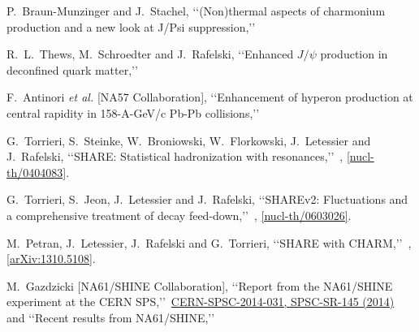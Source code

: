 \begin{thebibliography}{100}
  P.~Braun-Munzinger and J.~Stachel,
\lq\lq (Non)thermal aspects of charmonium production and a new look at J/Psi suppression,\rq\rq\
  
  R.~L.~Thews, M.~Schroedter and J.~Rafelski,
\lq\lq Enhanced $J/\psi$ production in deconfined quark matter,\rq\rq\
 
 

  F.~Antinori {\it et al.} [NA57 Collaboration],
\lq\lq Enhancement of hyperon production at central rapidity in 158-A-GeV/c Pb-Pb collisions,\rq\rq\
    



 G.~Torrieri, S.~Steinke, W.~Broniowski, W.~Florkowski, J.~Letessier and J.~Rafelski,
 \lq\lq SHARE: Statistical hadronization with resonances,\rq\rq\ 
 , 
 \href{http://arxiv.org/abs/nucl-th/0404083}{[nucl-th/0404083]}.

 
 G.~Torrieri, S.~Jeon, J.~Letessier and J.~Rafelski,
 \lq\lq SHAREv2: Fluctuations and a comprehensive treatment of decay feed-down,\rq\rq\ 
 ,
\href{http://arxiv.org/abs/nucl-th/0603026}{[nucl-th/0603026]}.

 
\bibitem{Petran:2013dva} 
 M.~Petran, J.~Letessier, J.~Rafelski and G.~Torrieri,
 \lq\lq SHARE with CHARM,\rq\rq\ 
 ,
 \href{http://arxiv.org/abs/arXiv:1310.5108}{[arXiv:1310.5108]}.

  
    
\bibitem{NA61Shine}
 M.~Gazdzicki  [NA61/SHINE Collaboration],
\lq\lq Report from the NA61/SHINE experiment at the CERN SPS,\rq\rq\ 
\href{http://cds.cern.ch/record/1955138}{CERN-SPSC-2014-031, SPSC-SR-145 (2014)} and 
\lq\lq Recent results from NA61/SHINE,\rq\rq\


\end{thebibliography}
